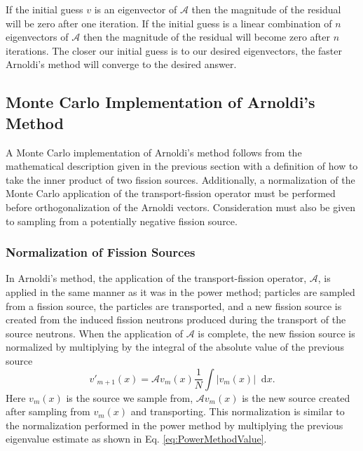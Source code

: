 \documentclass[12]{ansnse}
\newcommand{\A}{\ensuremath{\mathcal{A}}}
\newcommand{\dd}{\ensuremath{\mathop{}\!\mathrm{d}}}
\begin{document}
\begin{doublespace}
If the initial guess $v$ is an eigenvector of \A{} then the magnitude of the residual will be zero after one iteration.  If the initial guess is a linear combination of $n$ eigenvectors of \A{} then the magnitude of the residual will become zero after $n$ iterations.  The closer our initial guess is to our desired eigenvectors, the faster Arnoldi's method will converge to the desired answer.  


\subsection{Monte Carlo Implementation of Arnoldi's Method}\label{sec:MCImplementation}
A Monte Carlo implementation of Arnoldi's method follows from the mathematical description given in the previous section with a definition of how to take the inner product of two fission sources.  Additionally, a normalization of the Monte Carlo application of the transport-fission operator must be performed before orthogonalization of the Arnoldi vectors.  Consideration must also be given to sampling from a potentially negative fission source.

\subsubsection{Normalization of Fission Sources}
In Arnoldi's method, the application of the transport-fission operator, \A, is applied in the same manner as it was in the power method; particles are sampled from a fission source, the particles are transported, and a new fission source is created from the induced fission neutrons produced during the transport of the source neutrons.  When the application of \A{} is complete, the new fission source is normalized by multiplying by the integral of the absolute value of the previous source
\begin{equation}
    v'_{m+1}(x) = \A v_m(x) \frac{1}{N}\int \left|v_m(x)\right| \dd x.
    \label{eq:ArnoldiFissionSourceNormalization}
\end{equation}
Here $v_m(x)$ is the source we sample from, $\A v_{m}(x)$ is the new source created after sampling from $v_{m}(x)$ and transporting.  This normalization is similar to the normalization performed in the power method by multiplying the previous eigenvalue estimate as shown in Eq. \eqref{eq:PowerMethodValue}.


\end{doublespace}
\end{document}
